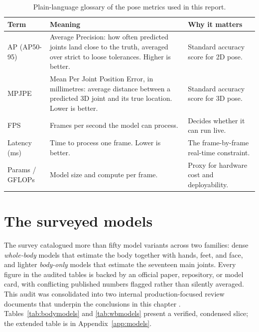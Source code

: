 \documentclass[oneside,openany]{book}
\begin{document}
\begin{table}[!h]
	\begin{center}
		\caption{Plain-language glossary of the pose metrics used in this report.}
		\label{tab:glossary}
		\footnotesize
		\begin{tabular}{p{2.6cm}p{7.6cm}p{3.6cm}}
			\toprule
			\textbf{Term} & \textbf{Meaning} & \textbf{Why it matters} \\
			\midrule
			AP (AP50-95) & Average Precision: how often predicted joints land close to the truth,
			averaged over strict to loose tolerances. Higher is better. & Standard accuracy score
			for 2D pose. \\
			MPJPE & Mean Per Joint Position Error, in millimetres: average distance between a
			predicted 3D joint and its true location. Lower is better. & Standard accuracy score
			for 3D pose. \\
			FPS & Frames per second the model can process. & Decides whether it can run live. \\
			Latency (ms) & Time to process one frame. Lower is better. & The frame-by-frame
			real-time constraint. \\
			Params / GFLOPs & Model size and compute per frame. & Proxy for hardware cost and
			deployability. \\
			\bottomrule
		\end{tabular}
	\end{center}
\end{table}

\section{The surveyed models}
The survey catalogued more than fifty model variants across two families: dense
\emph{whole-body} models that estimate the body together with hands, feet, and face, and lighter
\emph{body-only} models that estimate the seventeen main joints. Every figure in the audited
tables is backed by an official paper, repository, or model card, with conflicting published
numbers flagged rather than silently averaged. This audit was consolidated into two internal
production-focused review documents that underpin the conclusions in this chapter
\cite{prodreview_centric,prodreview_comparative}. Tables~\ref{tab:bodymodels} and
\ref{tab:wbmodels} present a verified, condensed slice; the extended table is in
Appendix~\ref{app:models}.
\end{document}
